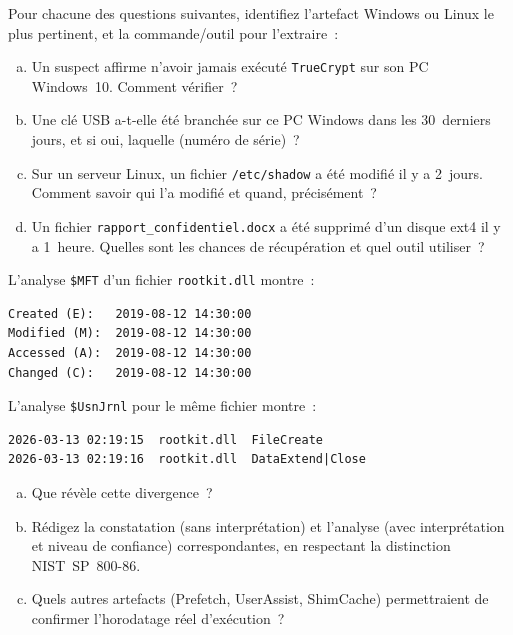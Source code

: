 \begin{boxexo}[title={\ding{45}\quad Exercice~14.1 --- Identification d'artefacts \niveaubase}]
Pour chacune des questions suivantes, identifiez l'artefact Windows
ou Linux le plus pertinent, et la commande/outil pour l'extraire~:
\begin{enumerate}[(a)]
    \item Un suspect affirme n'avoir jamais exécuté \texttt{TrueCrypt}
          sur son PC Windows~10. Comment vérifier~?
    \item Une clé USB a-t-elle été branchée sur ce PC Windows dans les
          30~derniers jours, et si oui, laquelle (numéro de série)~?
    \item Sur un serveur Linux, un fichier \texttt{/etc/shadow} a été
          modifié il y a 2~jours. Comment savoir qui l'a modifié et quand,
          précisément~?
    \item Un fichier \texttt{rapport\_confidentiel.docx} a été supprimé
          d'un disque ext4 il y a 1~heure. Quelles sont les chances de
          récupération et quel outil utiliser~?
\end{enumerate}
\end{boxexo}

\begin{boxexo}[title={\ding{45}\quad Exercice~14.2 --- Détection de timestomping \niveaumoyen}]
L'analyse \texttt{\$MFT} d'un fichier \texttt{rootkit.dll} montre~:
\begin{lstlisting}[language=bash_forensique]
Created (E):   2019-08-12 14:30:00
Modified (M):  2019-08-12 14:30:00
Accessed (A):  2019-08-12 14:30:00
Changed (C):   2019-08-12 14:30:00
\end{lstlisting}
L'analyse \texttt{\$UsnJrnl} pour le même fichier montre~:
\begin{lstlisting}[language=bash_forensique]
2026-03-13 02:19:15  rootkit.dll  FileCreate
2026-03-13 02:19:16  rootkit.dll  DataExtend|Close
\end{lstlisting}
\begin{enumerate}[(a)]
    \item Que révèle cette divergence~?
    \item Rédigez la constatation (sans interprétation) et l'analyse
          (avec interprétation et niveau de confiance) correspondantes,
          en respectant la distinction NIST~SP~800-86.
    \item Quels autres artefacts (Prefetch, UserAssist, ShimCache)
          permettraient de confirmer l'horodatage réel d'exécution~?
\end{enumerate}
\end{boxexo}

